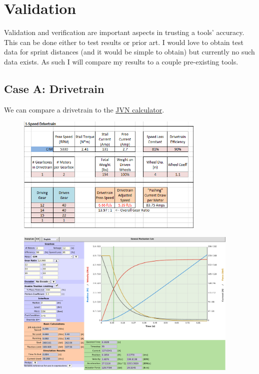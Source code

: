 \documentclass[10pt,letterpaper]{article}
\begin{document}
	\section*{Validation}
	Validation and verification are important aspects in trusting a tools' accuracy. This can be done either to test results or prior art. I would love to obtain test data for sprint distances (and it would be simple to obtain) but currently no such data exists. As such I will compare my results to a couple pre-existing tools.

	\newpage
	\subsection*{Case A: Drivetrain}
	We can compare a drivetrain to the \href{https://www.chiefdelphi.com/t/paper-jvns-mechanical-design-calculator-2016/146281}{\underline{JVN calculator}}.

	\begin{figure}[H]
		\includegraphics[width=0.80\textwidth]{validation/mechanism_JVN_A.png}
	\end{figure}

	\begin{figure}[H]
		\includegraphics[width=0.95\textwidth]{validation/mechanism_EC_A.png}
	\end{figure}
\end{document}
